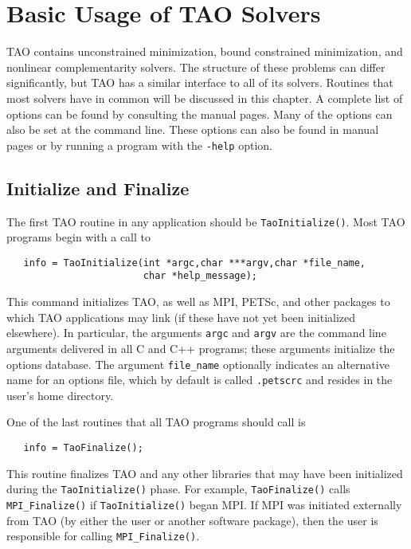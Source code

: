 %
%

\chapter{Basic Usage of TAO Solvers}
\label{chapter:tao_solver}

TAO contains unconstrained minimization, bound constrained minimization, 
and nonlinear complementarity solvers.
The structure of these problems can differ significantly, 
but TAO has a similar interface to all of its solvers.  
Routines that most solvers have in common will be discussed in 
this chapter.
A complete list of options can be found by consulting the manual pages.
Many of the options can also be set at the command line.  These options
can also be found in manual pages or by
running a program with the {\tt -help} option.


\section{Initialize and Finalize}
The first TAO routine in any application should be {\tt TaoInitialize()}.
Most TAO programs begin with a call to
\begin{verbatim}
   info = TaoInitialize(int *argc,char ***argv,char *file_name, 
                        char *help_message);
\end{verbatim}
\noindent
This command initializes TAO, as well as MPI, PETSc, and other packages
to which TAO applications may link (if these have not yet
been initialized elsewhere).  
In particular, the arguments {\tt argc} and 
{\tt argv} are the command line arguments delivered in all C and C++
programs; these arguments initialize the options database.  
 The argument {\tt file\_name}
optionally indicates an alternative name for an options file, which by
default is called {\tt .petscrc} and resides in the user's home directory.

One of the last routines that all TAO programs should 
call is 
\begin{verbatim}
   info = TaoFinalize();
\end{verbatim}
\noindent
This routine finalizes TAO and any other libraries that may have been
initialized during the {\tt TaoInitialize()} phase.
For example, {\tt TaoFinalize()}
calls {\tt MPI\_Finalize()} %
if {\tt TaoInitialize()}
began MPI. If MPI was initiated externally from TAO (by either
the user or another software package), then the user is
responsible for calling {\tt MPI\_Finalize()}. 

